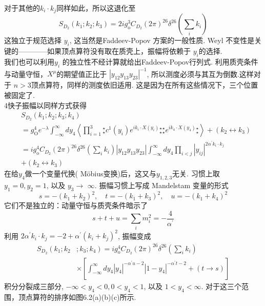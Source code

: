 对于其他的$k_{i} \cdot k_{j}$同样如此，所以这退化至
\begin{equation}
	S_{D_{2}}\left(k_{1} ; k_{2} ; k_{3}\right)=2 i g_{\mathrm{o}}^{3} C_{D_{2}}(2 \pi)^{26} \delta^{26}\left(\sum_{i} k_{i}\right)
\end{equation}
这独立于规范选择 $y_{i}$, 这当然是Faddeev-Popov 方案的一般性质.  Weyl 不变性是关键的————如果顶点算符没有取在质壳上，振幅将依赖于 $y_{i}$的选择.\\
我们也可以利用$y_{i}$ 的独立性不经计算就给出Faddeev-Popov行列式. 利用质壳条件与动量守恒，$X^{\mu}$的期望值正比于 $\left|y_{12} y_{13} y_{23}\right|^{-1}$, 所以测度必须与其互为倒数.这样对于 $n>3$顶点算符，同样的测度依旧适用. 这是因为在所有这些情况下，三个位置被固定了.\\
4快子振幅以同样方式获得
\begin{equation}
\begin{aligned}
&S_{D_{2}}(k_{1} ; k_{2} ; k_{3} ; k_{4}) \\
&=g_{\mathrm{O}}^{4} e^{-\lambda} \int_{-\infty}^{\infty} d y_{4}\left\langle\prod_{i=1}^{3} {}_\star^\star c^{1}(y_{i}) e^{i k_{i} \cdot X(y_{i}) }{}_\star^\star {}_\star^\star e^{i k_{4} \cdot X(y_{4})}{}_\star^\star \right\rangle+(k_{2} \leftrightarrow k_{3}) \\
	&=i g_{\mathrm{o}}^{4} C_{D_{2}}(2 \pi)^{26} \delta^{26}(\sum_{i} k_{i})\left|y_{12} y_{13} y_{23}\right| \int_{-\infty}^{\infty} d y_{4} \prod_{i<j}\left|y_{i j}\right|^{2 \alpha^{\prime} k_{i} \cdot k_{j}} \\
	&+(k_{2} \leftrightarrow k_{3}) 
\end{aligned}
\end{equation}
在给$y_{4} $做一个变量代换( Möbius变换)后，这又与$y_{1,2,3}$无关. 习惯上取 $y_{1}=0, y_{2}=1$, 以及 $y_{3} \rightarrow$ $\infty$. 振幅习惯上写成 Mandelstam 变量的形式
\begin{equation}
	s=-\left(k_{1}+k_{2}\right)^{2}, \quad t=-\left(k_{1}+k_{3}\right)^{2}, \quad u=-\left(k_{1}+k_{4}\right)^{2}
\end{equation}
它们不是独立的：动量守恒与质壳条件暗示了
\begin{equation}
	s+t+u=\sum_{i} m_{i}^{2}=-\frac{4}{\alpha^{\prime}}
\end{equation}
利用 $2 \alpha^{\prime} k_{i} \cdot k_{j}=-2+\alpha^{\prime}\left(k_{i}+k_{j}\right)^{2}$, 振幅变成
\begin{equation}
	\begin{aligned}
		S_{D_{2}}\left(k_{1} ; k_{2}\right.&\left.; k_{3} ; k_{4}\right)=i g_{\mathrm{o}}^{4} C_{D_{2}}(2 \pi)^{26} \delta^{26}\left(\sum_{i} k_{i}\right) \\
		& \times\left[\int_{-\infty}^{\infty} d y_{4}\left|y_{4}\right|^{-\alpha^{\prime} u-2}\left|1-y_{4}\right|^{-\alpha^{\prime} t-2}+(t \rightarrow s)\right]
	\end{aligned}
\end{equation}
积分分裂成三部分, $-\infty<y_{4}<0,0<y_{4}<1$, 以及 $1<y_{4}<\infty $.  对于这三个范围，顶点算符的排序如图6.2(a)(b)(c)所示.\\ 

